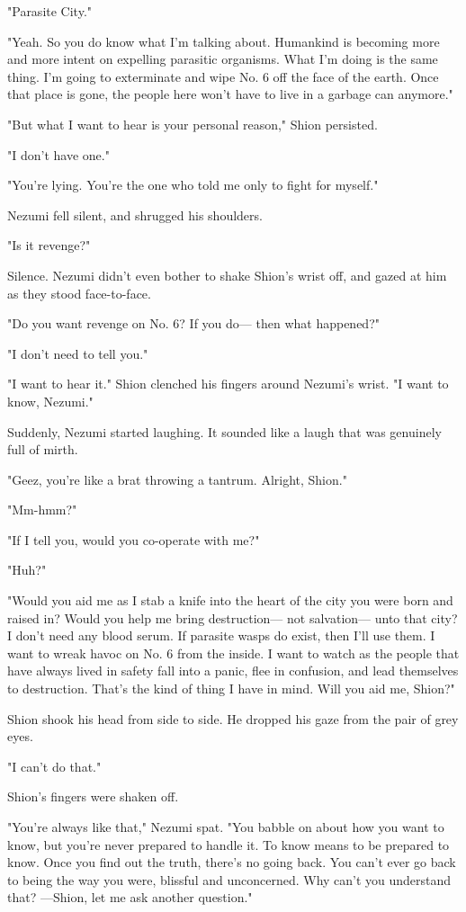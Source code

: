 "Parasite City."

"Yeah. So you do know what I'm talking about. Humankind is becoming more
and more intent on expelling parasitic organisms. What I'm doing is the
same thing. I'm going to exterminate and wipe No. 6 off the face of the
earth. Once that place is gone, the people here won't have to live in a
garbage can anymore."

"But what I want to hear is your personal reason," Shion persisted.

"I don't have one."

"You're lying. You're the one who told me only to fight for myself."

Nezumi fell silent, and shrugged his shoulders.

"Is it revenge?"

Silence. Nezumi didn't even bother to shake Shion's wrist off, and gazed
at him as they stood face-to-face.

"Do you want revenge on No. 6? If you do--- then what happened?"

"I don't need to tell you."

"I want to hear it." Shion clenched his fingers around Nezumi's wrist.
"I want to know, Nezumi."

Suddenly, Nezumi started laughing. It sounded like a laugh that was
genuinely full of mirth.

"Geez, you're like a brat throwing a tantrum. Alright, Shion."

"Mm-hmm?"

"If I tell you, would you co-operate with me?"

"Huh?"

"Would you aid me as I stab a knife into the heart of the city you were
born and raised in? Would you help me bring destruction--- not salvation---
unto that city? I don't need any blood serum. If parasite wasps do
exist, then I'll use them. I want to wreak havoc on No. 6 from the
inside. I want to watch as the people that have always lived in safety
fall into a panic, flee in confusion, and lead themselves to
destruction. That's the kind of thing I have in mind. Will you aid me,
Shion?"

Shion shook his head from side to side. He dropped his gaze from the
pair of grey eyes.

"I can't do that."

Shion's fingers were shaken off.

"You're always like that," Nezumi spat. "You babble on about how you
want to know, but you're never prepared to handle it. To know means to
be prepared to know. Once you find out the truth, there's no going back.
You can't ever go back to being the way you were, blissful and
unconcerned. Why can't you understand that? ---Shion, let me ask another
question."


